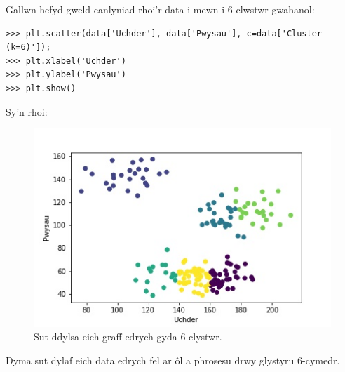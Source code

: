 Gallwn hefyd gweld canlyniad rhoi'r data i mewn i 6 clwstwr gwahanol: 

\begin{verbatim}
>>> plt.scatter(data['Uchder'], data['Pwysau'], c=data['Cluster (k=6)']);
>>> plt.xlabel('Uchder')
>>> plt.ylabel('Pwysau')
>>> plt.show()
\end{verbatim}

Sy'n rhoi:

\begin{figure}[H]
\begin{center}
\includegraphics[width=0.7\linewidth]{../img/6clystwrpython.jpeg}
\caption{Sut ddylsa eich graff edrych gyda 6 clystwr.}
\label{fig:6clystwrpython}
\end{center}
\end{figure}

Dyma sut dylaf eich data edrych fel ar \^{o}l a phrosesu drwy glystyru 6-cymedr. 